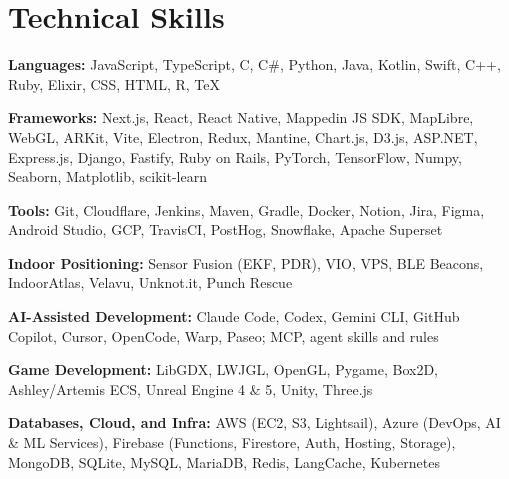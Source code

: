 \documentclass[standalone,9pt]{extarticle}
\newcommand{\resumeSubHeadingListStart}{\begin{itemize}[leftmargin=0.15in, itemsep=0pt, label={}]}
\newcommand{\resumeSubHeadingListEnd}{\end{itemize}}
\newcommand{\skillItem}[2]{
    \item \textbf{#1:} #2
}
\begin{document}
\section{Technical Skills}
\resumeSubHeadingListStart
    \small{
        \skillItem{Languages}{JavaScript, TypeScript, C, C\#, Python, Java, Kotlin, Swift, C++, Ruby, Elixir, CSS, HTML, R, TeX}

        \skillItem{Frameworks}{Next.js, React, React Native, Mappedin JS SDK, MapLibre, WebGL, ARKit, Vite, Electron, Redux, Mantine, Chart.js, D3.js, ASP.NET, Express.js, Django, Fastify, Ruby on Rails, PyTorch, TensorFlow, Numpy, Seaborn, Matplotlib, scikit-learn}

        \skillItem{Tools}{Git, Cloudflare, Jenkins, Maven, Gradle, Docker, Notion, Jira, Figma, Android Studio, GCP, TravisCI, PostHog, Snowflake, Apache Superset}

        \skillItem{Indoor Positioning}{Sensor Fusion (EKF, PDR), VIO, VPS, BLE Beacons, IndoorAtlas, Velavu, Unknot.it, Punch Rescue}

        \skillItem{AI-Assisted Development}{Claude Code, Codex, Gemini CLI, GitHub Copilot, Cursor, OpenCode, Warp, Paseo; MCP, agent skills and rules}

        \skillItem{Game Development}{LibGDX, LWJGL, OpenGL, Pygame, Box2D, Ashley/Artemis ECS, Unreal Engine 4 \& 5, Unity, Three.js}

        \skillItem{Databases, Cloud, and Infra}{AWS (EC2, S3, Lightsail), Azure (DevOps, AI \& ML Services), Firebase (Functions, Firestore, Auth, Hosting, Storage), MongoDB, SQLite, MySQL, MariaDB, Redis, LangCache, Kubernetes}
    }
\resumeSubHeadingListEnd
\end{document}
